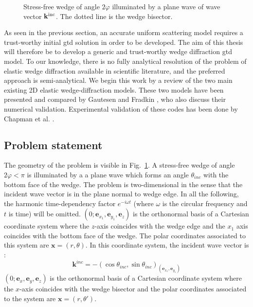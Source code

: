\begin{figure}
\caption{Stress-free wedge of angle $2\varphi$ illuminated by a plane wave of wave vector $\mathbf{k}^{\rm inc}$. The dotted line is the wedge bisector.}
\label{C1:wedge}
\end{figure}

As seen in the previous section, an accurate uniform scattering model requires a trust-worthy initial \acrshort{gtd} solution in order to be developed. The aim of this thesis will therefore be to develop a generic and trust-worthy wedge diffraction \acrshort{gtd} model. To our knowledge, there is no fully analytical resolution of the problem of elastic wedge diffraction available in scientific literature, and the preferred approach is semi-analytical. We begin this work by a review of the two main existing 2D elastic wedge-diffraction models. These two models have been presented and compared by Gautesen and Fradkin \cite{GautesenFradkin}, who also discuss their numerical validation. Experimental validation  of these codes has been done by Chapman et al. \cite{ChapmanBurch}.

\subsection{Problem statement}
\label{C1:PbStatement}
The geometry of the problem is visible in Fig.~\ref{C1:wedge}. A stress-free wedge of angle $2\varphi<\pi$ is illuminated by a a plane wave which forms an angle $\theta_{inc}$ with the bottom face of the wedge. The problem is two-dimensional in the sense that the incident wave vector is in the plane normal to wedge edge. In all the following, the harmonic time-dependency factor $e^{- i\omega t}$ (where $\omega$ is the circular frequency and $t$ is time) will be omitted. $(0;\mathbf{e}_{x_1},\mathbf{e}_{y_1},\mathbf{e}_z)$ is the orthonormal basis of a Cartesian coordinate system where the $z$-axis coincides with the wedge edge and the $x_1$ axis coincides with the bottom face of the wedge. The polar coordinates associated to this system are $\mathbf{x}=(r,\theta)$. In this coordinate system, the incident wave vector is :
\begin{equation}
\mathbf{k}^{inc}=-(\cos\theta_{inc},\sin\theta_{inc})_{(\mathbf{e}_{x_1},\mathbf{e}_{y_1})}
\end{equation}
$(0;\mathbf{e}_x,\mathbf{e}_y,\mathbf{e}_z)$ is the orthonormal basis of a Cartesian coordinate system where the $x$-axis coincides with the wedge bisector and the polar coordinates associated to the system are $\mathbf{x}=(r,\theta')$.

